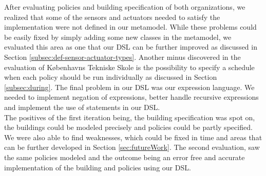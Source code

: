 After evaluating policies and building specification of both organizations, we realized that some of the sensors and actuators needed to satisfy the implementation were not defined in our metamodel. While these problems could be easily fixed by simply adding some new classes in the metamodel, we evaluated this area as one that our DSL can be further improved as discussed in Section \ref{subsec:def-sensor-actuator-types}. Another minus discovered in the evaluation of K\o benhavns Tekniske Skole is the possibility to specify a schedule when each policy should be run individually as discussed in Section \ref{subsec:during}. The final problem in our DSL was our expression language. We needed to implement negation of expressions, better handle recursive expressions and implement the use of statements in our DSL.\\

The positives of the first iteration being, the building specification was spot on, the buildings could be modeled precisely and policies could be partly specified. We were also able to find weaknesses, which could be fixed in time and areas that can be further developed in Section \ref{sec:futureWork}. The second evaluation, saw the same policies modeled and the outcome being an error free and accurate implementation of the building and policies using our DSL. 